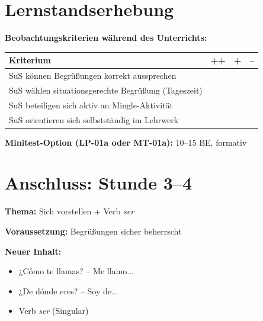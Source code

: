 \documentclass[11pt,a4paper]{article}
\begin{document}
\vspace{1em}

\section*{Lernstandserhebung}

\textbf{Beobachtungskriterien während des Unterrichts:}

\begin{tabularx}{\textwidth}{|X|c|c|c|}
\hline
\textbf{Kriterium} & \textbf{++} & \textbf{+} & \textbf{--} \\
\hline
SuS können Begrüßungen korrekt aussprechen & & & \\
\hline
SuS wählen situationsgerechte Begrüßung (Tageszeit) & & & \\
\hline
SuS beteiligen sich aktiv an Mingle-Aktivität & & & \\
\hline
SuS orientieren sich selbstständig im Lehrwerk & & & \\
\hline
\end{tabularx}

\vspace{0.5em}

\textbf{Minitest-Option (LP-01a oder MT-01a):} 10--15 BE, formativ

\vspace{1em}

\section*{Anschluss: Stunde 3--4}

\textbf{Thema:} Sich vorstellen + Verb \textit{ser}

\textbf{Voraussetzung:} Begrüßungen sicher beherrscht

\textbf{Neuer Inhalt:}
\begin{itemize}[nosep]
    \item ¿Cómo te llamas? -- Me llamo...
    \item ¿De dónde eres? -- Soy de...
    \item Verb \textit{ser} (Singular)
\end{itemize}
\end{document}

